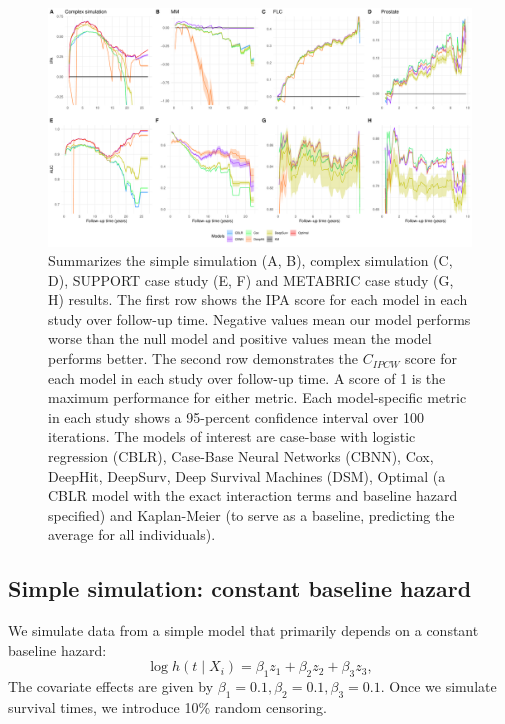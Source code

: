 \documentclass[APA,LATO1COL]{WileyNJD-v2}
\begin{document}
\begin{figure}

{\centering \includegraphics[width=1\linewidth]{../../../analyses/figures/megaPlot} 

}

\caption{Summarizes the simple simulation (A, B), complex simulation (C, D), SUPPORT case study (E, F) and METABRIC case study (G, H) results. The first row shows the IPA score for each model in each study over follow-up time. Negative values mean our model performs worse than the null model and positive values mean the model performs better. The second row demonstrates the $C_{IPCW}$ score for each model in each study over follow-up time. A score of 1 is the maximum performance for either metric. Each model-specific metric in each study shows a 95-percent confidence interval over 100 iterations. The models of interest are case-base with logistic regression (CBLR), Case-Base Neural Networks (CBNN), Cox, DeepHit, DeepSurv, Deep Survival Machines (DSM), Optimal (a CBLR model with the exact interaction terms and baseline hazard specified) and Kaplan-Meier (to serve as a baseline, predicting the average for all individuals).}\label{fig:megaPlot}
\end{figure}


\hypertarget{simple-simulation-constant-baseline-hazard}{%
\subsection{Simple simulation: constant baseline
hazard}\label{simple-simulation-constant-baseline-hazard}}

We simulate data from a simple model that primarily depends on a
constant baseline hazard:
\[\log h(t \mid X_i) = \beta_{{1}}z_{1}+\beta_{{2}}z_{2}+\beta_{{3}}z_{3},\]
The covariate effects are given by
\(\beta_{{1}}=0.1, \beta_{{2}}=0.1, \beta_{{3}}=0.1\). Once we simulate
survival times, we introduce 10\% random censoring.
\end{document}
